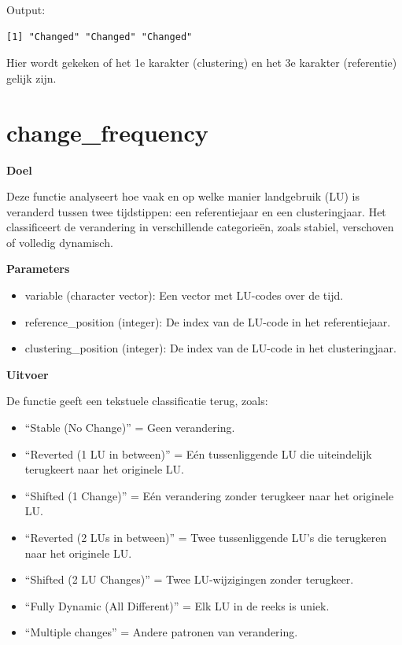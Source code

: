 \documentclass[twoside]{extreport}
\providecommand{\tightlist}{%
  \setlength{\itemsep}{0pt}\setlength{\parskip}{0pt}}\usepackage{longtable,booktabs,array}
\begin{document}
Output:

\begin{verbatim}
[1] "Changed" "Changed" "Changed"
\end{verbatim}

Hier wordt gekeken of het 1e karakter (clustering) en het 3e karakter
(referentie) gelijk zijn.

\section{change\_frequency}\label{change_frequency}

\textbf{Doel}

Deze functie analyseert hoe vaak en op welke manier landgebruik (LU) is
veranderd tussen twee tijdstippen: een referentiejaar en een
clusteringjaar. Het classificeert de verandering in verschillende
categorieën, zoals stabiel, verschoven of volledig dynamisch.

\textbf{Parameters}

\begin{itemize}
\tightlist
\item
  variable (character vector): Een vector met LU-codes over de tijd.
\item
  reference\_position (integer): De index van de LU-code in het
  referentiejaar.
\item
  clustering\_position (integer): De index van de LU-code in het
  clusteringjaar.
\end{itemize}

\textbf{Uitvoer}

De functie geeft een tekstuele classificatie terug, zoals:

\begin{itemize}
\tightlist
\item
  ``Stable (No Change)'' = Geen verandering.
\item
  ``Reverted (1 LU in between)'' = Eén tussenliggende LU die
  uiteindelijk terugkeert naar het originele LU.
\item
  ``Shifted (1 Change)'' = Eén verandering zonder terugkeer naar het
  originele LU.
\item
  ``Reverted (2 LUs in between)'' = Twee tussenliggende LU's die
  terugkeren naar het originele LU.
\item
  ``Shifted (2 LU Changes)'' = Twee LU-wijzigingen zonder terugkeer.
\item
  ``Fully Dynamic (All Different)'' = Elk LU in de reeks is uniek.
\item
  ``Multiple changes'' = Andere patronen van verandering.
\end{itemize}
\end{document}
